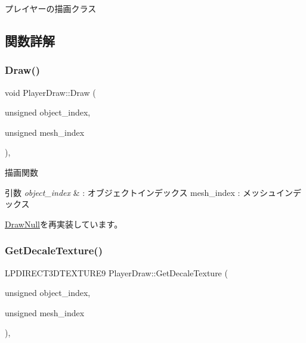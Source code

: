 プレイヤーの描画クラス 

\subsection{関数詳解}
\mbox{\label{class_player_draw_a8b9e8caa6bea7295f58a0aaddeb9458b}} 
\subsubsection{\texorpdfstring{Draw()}{Draw()}}
{\footnotesize\ttfamily void Player\+Draw\+::\+Draw (\begin{DoxyParamCaption}\item[{unsigned}]{object\+\_\+index,  }\item[{unsigned}]{mesh\+\_\+index }\end{DoxyParamCaption})\hspace{0.3cm}{\ttfamily [override]}, {\ttfamily [virtual]}}



描画関数 


\begin{DoxyParams}{引数}
{\em object\+\_\+index} & \+: オブジェクトインデックス mesh\+\_\+index \+: メッシュインデックス \\
\hline
\end{DoxyParams}


\mbox{\hyperlink{class_draw_null_afe50f6fd820b18d673f70f048743f339}{Draw\+Null}}を再実装しています。

\mbox{\label{class_player_draw_a6cecfb28942044efff0b9d6213b511a5}} 
\subsubsection{\texorpdfstring{Get\+Decale\+Texture()}{GetDecaleTexture()}}
{\footnotesize\ttfamily L\+P\+D\+I\+R\+E\+C\+T3\+D\+T\+E\+X\+T\+U\+R\+E9 Player\+Draw\+::\+Get\+Decale\+Texture (\begin{DoxyParamCaption}\item[{unsigned}]{object\+\_\+index,  }\item[{unsigned}]{mesh\+\_\+index }\end{DoxyParamCaption})\hspace{0.3cm}{\ttfamily [override]}, {\ttfamily [virtual]}}



